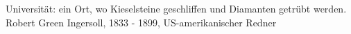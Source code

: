 {Universität: ein Ort, wo Kieselsteine geschliffen und Diamanten getrübt werden.}
{Robert Green Ingersoll, 1833 - 1899, US-amerikanischer Redner}



